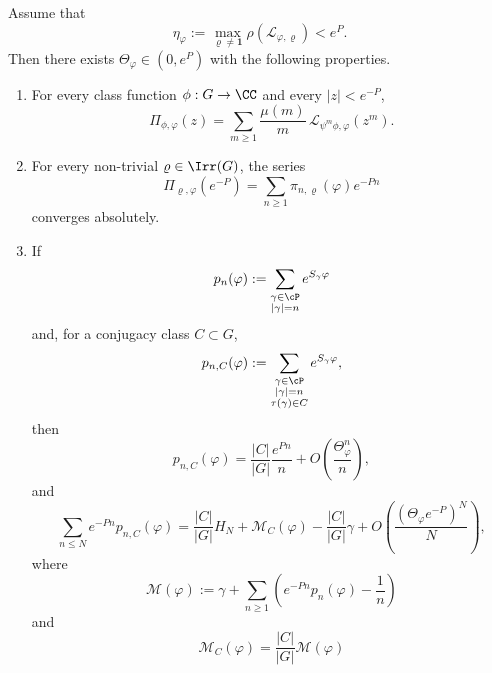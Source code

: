 \begin{theorem}
  \label{thm:holder-transfer-perron-point}
  Assume that
  \[
    \eta_\varphi
    :=
    \max_{\varrho\neq\mathbf 1}\rho(\mathscr L_{\varphi,\varrho})
    <e^P.
  \]
  Then there exists \(\Theta_\varphi\in(0,e^P)\) with the following
  properties.
  \begin{enumerate}[label=\textup{(\roman*)}]
    \item For every class function \(\phi:G\to\CC\) and every
      \(|z|<e^{-P}\),
      \begin{equation}\label{eq:holder-transfer-adams-mobius}
        \Pi_{\phi,\varphi}(z)
        =
        \sum_{m\ge 1}\frac{\mu(m)}{m}\,
          \mathcal L_{\psi^m\phi,\varphi}(z^m).
      \end{equation}
    \item For every non-trivial \(\varrho\in\Irr(G)\), the series
      \[
        \Pi_{\varrho,\varphi}(e^{-P})
        =
        \sum_{n\ge 1}\pi_{n,\varrho}(\varphi)e^{-Pn}
      \]
      converges absolutely.
    \item If
      \[
        p_n(\varphi)
        :=
        \sum_{\substack{\gamma\in\cP\\ |\gamma|=n}}
          e^{S_\gamma\varphi}
      \]
      and, for a conjugacy class \(C\subset G\),
      \[
        p_{n,C}(\varphi)
        :=
        \sum_{\substack{\gamma\in\cP\\ |\gamma|=n\\
          \tau(\gamma)\in C}}
          e^{S_\gamma\varphi},
      \]
      then
      \begin{equation}\label{eq:holder-transfer-pointwise}
        p_{n,C}(\varphi)
        =
        \frac{|C|}{|G|}\frac{e^{Pn}}{n}
        +O\!\left(\frac{\Theta_\varphi^n}{n}\right),
      \end{equation}
      and
      \begin{equation}\label{eq:holder-transfer-mertens}
        \sum_{n\le N}e^{-Pn}p_{n,C}(\varphi)
        =
        \frac{|C|}{|G|}H_N
        +\mathcal M_C(\varphi)-\frac{|C|}{|G|}\gamma
        +O\!\left(\frac{(\Theta_\varphi e^{-P})^N}{N}\right),
      \end{equation}
      where
      \[
        \mathcal M(\varphi)
        :=
        \gamma+\sum_{n\ge 1}
          \left(e^{-Pn}p_n(\varphi)-\frac{1}{n}\right)
      \]
      and
      \begin{equation}\label{eq:holder-transfer-constant}
        \mathcal M_C(\varphi)
        =
        \frac{|C|}{|G|}\mathcal M(\varphi)

\end{equation}
\end{enumerate}
\end{theorem}
